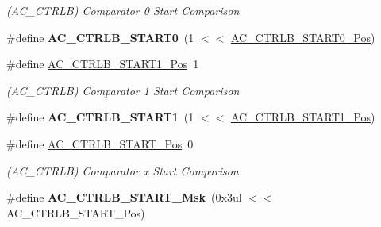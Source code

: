 \begin{DoxyCompactItemize}
\begin{DoxyCompactList}\small\item\em (A\+C\+\_\+\+C\+T\+R\+L\+B) Comparator 0 Start Comparison \end{DoxyCompactList}\item 
\hypertarget{group___s_a_m_l21___a_c_ga285b0d9ac053ea457fbd4e54c4435462}{}\#define {\bfseries A\+C\+\_\+\+C\+T\+R\+L\+B\+\_\+\+S\+T\+A\+R\+T0}~(1 $<$$<$ \hyperlink{group___s_a_m_l21___a_c_ga9fe01e62bcc1df5dd7eebbdae8e28ebb}{A\+C\+\_\+\+C\+T\+R\+L\+B\+\_\+\+S\+T\+A\+R\+T0\+\_\+\+Pos})\label{group___s_a_m_l21___a_c_ga285b0d9ac053ea457fbd4e54c4435462}

\item 
\hypertarget{group___s_a_m_l21___a_c_ga285cbdca40bedb61659d00dbb41a2d7f}{}\#define \hyperlink{group___s_a_m_l21___a_c_ga285cbdca40bedb61659d00dbb41a2d7f}{A\+C\+\_\+\+C\+T\+R\+L\+B\+\_\+\+S\+T\+A\+R\+T1\+\_\+\+Pos}~1\label{group___s_a_m_l21___a_c_ga285cbdca40bedb61659d00dbb41a2d7f}

\begin{DoxyCompactList}\small\item\em (A\+C\+\_\+\+C\+T\+R\+L\+B) Comparator 1 Start Comparison \end{DoxyCompactList}\item 
\hypertarget{group___s_a_m_l21___a_c_ga6249a3c77b45bfe05b90460ef4f35681}{}\#define {\bfseries A\+C\+\_\+\+C\+T\+R\+L\+B\+\_\+\+S\+T\+A\+R\+T1}~(1 $<$$<$ \hyperlink{group___s_a_m_l21___a_c_ga285cbdca40bedb61659d00dbb41a2d7f}{A\+C\+\_\+\+C\+T\+R\+L\+B\+\_\+\+S\+T\+A\+R\+T1\+\_\+\+Pos})\label{group___s_a_m_l21___a_c_ga6249a3c77b45bfe05b90460ef4f35681}

\item 
\hypertarget{group___s_a_m_l21___a_c_ga5699a352a32415762e7ae47f727c34e2}{}\#define \hyperlink{group___s_a_m_l21___a_c_ga5699a352a32415762e7ae47f727c34e2}{A\+C\+\_\+\+C\+T\+R\+L\+B\+\_\+\+S\+T\+A\+R\+T\+\_\+\+Pos}~0\label{group___s_a_m_l21___a_c_ga5699a352a32415762e7ae47f727c34e2}

\begin{DoxyCompactList}\small\item\em (A\+C\+\_\+\+C\+T\+R\+L\+B) Comparator x Start Comparison \end{DoxyCompactList}\item 
\hypertarget{group___s_a_m_l21___a_c_gade31a7da59dce5680a3b3d649d659785}{}\#define {\bfseries A\+C\+\_\+\+C\+T\+R\+L\+B\+\_\+\+S\+T\+A\+R\+T\+\_\+\+Msk}~(0x3ul $<$$<$ A\+C\+\_\+\+C\+T\+R\+L\+B\+\_\+\+S\+T\+A\+R\+T\+\_\+\+Pos)\label{group___s_a_m_l21___a_c_gade31a7da59dce5680a3b3d649d659785}


\end{DoxyCompactItemize}
